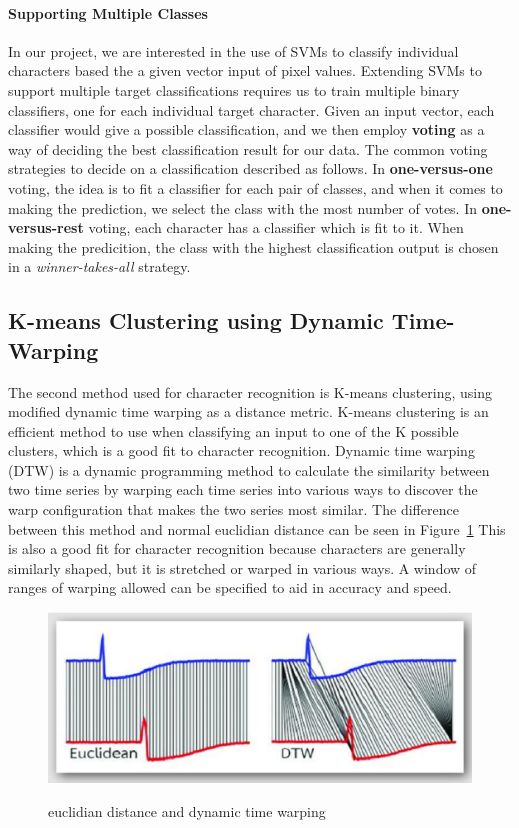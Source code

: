 \documentclass[12pt]{article}
\begin{document}
	\paragraph{Supporting Multiple Classes}
	In our project, we are interested in the use of SVMs to classify individual characters based the a given vector input of pixel values. Extending SVMs to support multiple target classifications requires us to train multiple binary classifiers, one for each individual target character. Given an input vector, each classifier would give a possible classification, and we then employ \textbf{voting} as a way of deciding the best classification result for our data. The common voting strategies to decide on a classification described as follows. 	In \textbf{one-versus-one} voting, the idea is to fit a classifier for each pair of classes, and when it comes to making the prediction, we select the class with the most number of votes. In \textbf{one-versus-rest} voting, each character has a classifier which is fit to it. When making the predicition, the class with the highest classification output is chosen in a \textit{winner-takes-all} strategy.

	\subsection{K-means Clustering using Dynamic Time-Warping}
	\label{subsection:dtw}
	The second method used for character recognition is K-means clustering, using modified dynamic time warping as a distance metric. K-means clustering is an efficient method to use when classifying an input to one of the K possible clusters, which is a good fit to character recognition. Dynamic time warping (DTW) is a dynamic programming method to calculate the similarity between two time series by warping each time series into various ways to discover the warp configuration that makes the two series most similar. The difference between this method and normal euclidian distance can be seen in Figure~\ref{figure:dtw} This is also a good fit for character recognition because characters are generally similarly shaped, but it is stretched or warped in various ways. A window of ranges of warping allowed can be specified to aid in accuracy and speed.
	
	\begin{figure}[htbp!]
		\centering
		\includegraphics[scale=0.7]{dtw.eps}
		\label{figure:dtw}
		\caption{euclidian distance and dynamic time warping}
		\end{figure}
	
\end{document}

